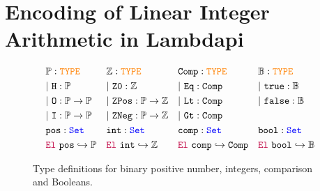 \section{Encoding of Linear Integer Arithmetic in Lambdapi}
\label{sec:encoding}



\begin{figure}[t]
\centering
\begin{align*}\label{eq:eq1}
&\bb{P}: \type & &\bb{Z}: \type   & &\tt{Comp}: \type & &\bb{B}: \type \\
&|~\tt{H} : \bb{P} & &|~\tt{Z0}: \bb{Z} & &|~\tt{Eq}: \tt{Comp} & &|~\tt{true}: \bb{B} \\
&|~\tt{O}: \bb{P} \ra \bb{P} & &|~\tt{ZPos}: \bb{P} \ra \bb{Z} & &|~\tt{Lt}: \tt{Comp} & &|~\tt{false}: \bb{B} \\
&|~\tt{I}: \bb{P} \ra \bb{P} & &|~\tt{ZNeg}: \bb{P} \ra \bb{Z} & &|~\tt{Gt}: \tt{Comp} & &\\
&\tt{pos}: \set & &\tt{int}: \set & &\tt{comp}: \set & &\tt{bool}: \set \\
&\el~\tt{pos} \re \bb{P} & &\el~\tt{int} \re \bb{Z} & &\el~\tt{comp} \re \tt{Comp} & &\el~\tt{bool} \re \bb{B}
\end{align*}
\caption{Type definitions for binary positive number, integers, comparison and Booleans.}
\label{fig:sorts-constructors}
\end{figure}

